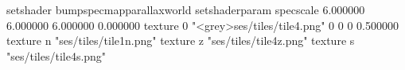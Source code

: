 setshader bumpspecmapparallaxworld
setshaderparam specscale 6.000000 6.000000 6.000000 0.000000
texture 0 "<grey>ses/tiles/tile4.png" 0 0 0 0.500000
texture n "ses/tiles/tile1n.png"
texture z "ses/tiles/tile4z.png"
texture s "ses/tiles/tile4s.png"

